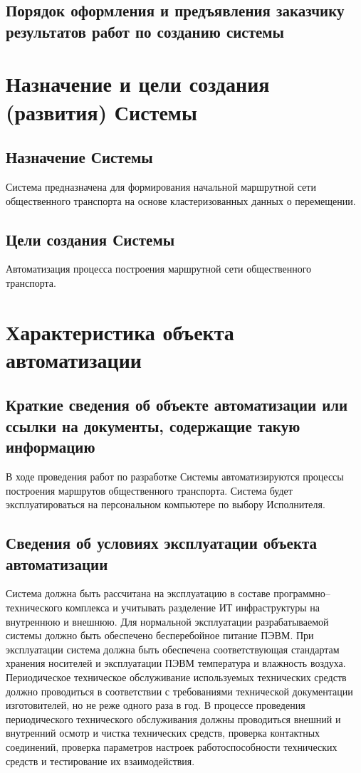 \section{Порядок оформления и предъявления заказчику результатов работ по созданию системы}

\chapter{Назначение и цели создания (развития) Системы}
\section{Назначение Системы}
Система предназначена для формирования начальной маршрутной сети общественного транспорта на основе 
кластеризованных данных о перемещении.

\section{Цели создания Системы}
Автоматизация процесса построения маршрутной сети общественного транспорта.

\chapter{Характеристика объекта автоматизации}
\section{Краткие сведения об объекте автоматизации или ссылки на документы, содержащие такую информацию}
В ходе проведения работ по разработке Системы автоматизируются процессы построения маршрутов общественного 
транспорта. Система будет эксплуатироваться на персональном компьютере по выбору Исполнителя.

\section{Сведения об условиях эксплуатации объекта автоматизации}
Система должна быть рассчитана на эксплуатацию в составе программно–технического комплекса и учитывать 
разделение ИТ инфраструктуры на внутреннюю и внешнюю. Для нормальной эксплуатации разрабатываемой системы 
должно быть обеспечено бесперебойное питание ПЭВМ. При эксплуатации система должна быть обеспечена 
соответствующая стандартам хранения носителей и эксплуатации ПЭВМ температура и влажность воздуха. 
Периодическое техническое обслуживание используемых технических средств должно проводиться в соответствии 
с требованиями технической документации изготовителей, но не реже одного раза в год. В процессе проведения 
периодического технического обслуживания должны проводиться внешний и внутренний осмотр и чистка 
технических средств, проверка контактных соединений, проверка параметров настроек работоспособности 
технических средств и тестирование их взаимодействия.

